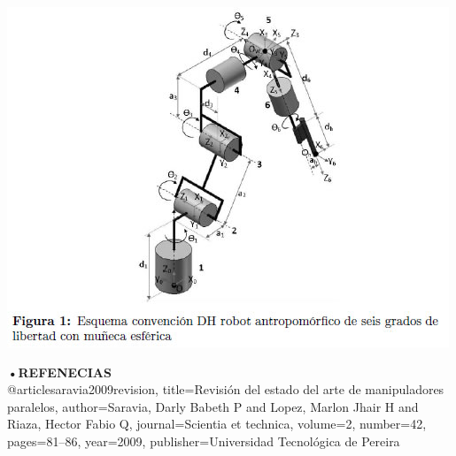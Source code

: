 \documentclass[10pt,a4paper]{article}
\begin{document}
\begin{center}
\includegraphics[scale=0.8]{imagenes/brazo 2.jpg} 
\end{center}
\large \huge \textbf{•REFENECIAS} \\

{@article{saravia2009revision,
  title={Revisi{\'o}n del estado del arte de manipuladores paralelos},
  author={Saravia, Darly Babeth P and Lopez, Marlon Jhair H and Riaza, Hector Fabio Q},
  journal={Scientia et technica},
  volume={2},
  number={42},
  pages={81--86},
  year={2009},
  publisher={Universidad Tecnol{\'o}gica de Pereira}}
}
\end{document}
